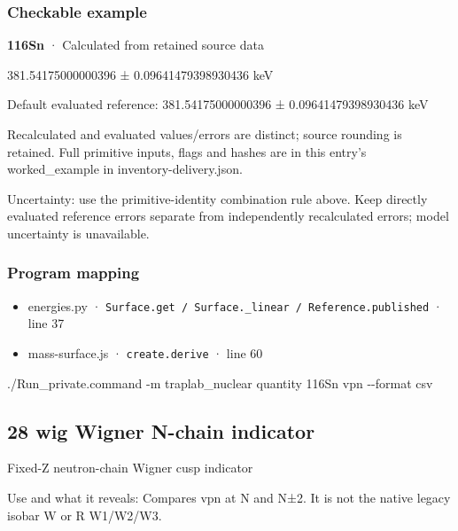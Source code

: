 \documentclass[
  11pt,
  letterpaper,
]{article}
\newenvironment{Shaded}{}{}
\newcommand{\AttributeTok}[1]{\textcolor[rgb]{0.49,0.56,0.16}{#1}}
\newcommand{\ExtensionTok}[1]{#1}
\newcommand{\NormalTok}[1]{#1}
\providecommand{\tightlist}{%
  \setlength{\itemsep}{0pt}\setlength{\parskip}{0pt}}
\begin{document}
\subsubsection{Checkable example}\label{checkable-example-26}

\textbf{116Sn} · Calculated from retained source data

381.54175000000396 ± 0.09641479398930436 keV

Default evaluated reference: 381.54175000000396 ± 0.09641479398930436
keV

Recalculated and evaluated values/errors are distinct; source rounding
is retained. Full primitive inputs, flags and hashes are in this entry's
worked\_example in inventory-delivery.json.

Uncertainty: use the primitive-identity combination rule above. Keep
directly evaluated reference errors separate from independently
recalculated errors; model uncertainty is unavailable.

\subsubsection{Program mapping}\label{program-mapping-26}

\begin{itemize}
\tightlist
\item
  energies.py ·
  \texttt{Surface.get\ /\ Surface.\_linear\ /\ Reference.published} ·
  line 37
\item
  mass-surface.js · \texttt{create.derive} · line 60
\end{itemize}

\begin{Shaded}
\begin{Highlighting}[]
\ExtensionTok{./Run\_private.command} \AttributeTok{{-}m}\NormalTok{ traplab\_nuclear quantity 116Sn vpn }\AttributeTok{{-}{-}format}\NormalTok{ csv}
\end{Highlighting}
\end{Shaded}

\subsection{28 wig Wigner N-chain
indicator}\label{wig-wigner-n-chain-indicator}

Fixed-Z neutron-chain Wigner cusp indicator

Use and what it reveals: Compares vpn at N and N±2. It is not the native
legacy isobar W or R W1/W2/W3.
\end{document}
